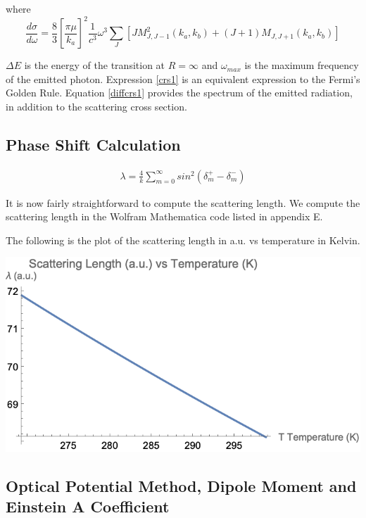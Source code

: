 where
\begin{equation}\label{diffcrs1}
\frac{d\sigma}{d\omega} = \frac{8}{3}\left[\frac{\pi \mu}{k_a}\right]^2 \frac{1}{c^3}\omega^3 \sum_{J}{\left[J M_{J,J-1}^2(k_a,k_b) + (J+1)M_{J,J+1}(k_a,k_b)\right] }
\end{equation}

$ \Delta E $ is the energy of the transition at $ R = \infty $ and $ \omega_{max} $ is the maximum frequency of the emitted photon. Expression \eqref{crs1} is an equivalent expression to the Fermi's Golden Rule. Equation \eqref{diffcrs1} provides the spectrum of the emitted radiation, in addition to the scattering cross section. 

\subsection{Phase Shift Calculation}

\begin{equation}
\begin{split}
  \lambda = \frac{4}{k}\sum_{m=0}^{\infty}{sin^2(\delta_m^{+}-\delta_m^{-})}
\end{split}
\end{equation}

It is now fairly straightforward to compute the scattering length. We compute the scattering length in the Wolfram Mathematica code listed in appendix E.

The following is the plot of the scattering length in a.u. vs temperature in Kelvin.

\includegraphics{CrossSection1.png}

\subsection{Optical Potential Method, Dipole Moment and Einstein A Coefficient}

